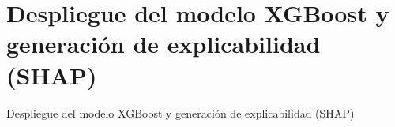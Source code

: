 \section{Despliegue del modelo XGBoost y generación de explicabilidad (SHAP)}
    Despliegue del modelo XGBoost y generación de explicabilidad (SHAP)